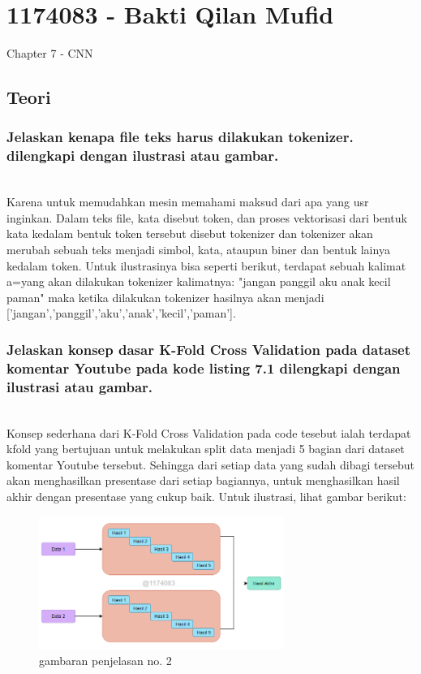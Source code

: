 \section{1174083 - Bakti Qilan Mufid}
Chapter 7 - CNN
\subsection{Teori}
\subsubsection{Jelaskan kenapa file teks harus dilakukan tokenizer. dilengkapi dengan ilustrasi atau gambar.}
\hfill\\
Karena untuk memudahkan mesin memahami maksud dari apa yang usr inginkan. Dalam teks file, kata disebut token, dan proses vektorisasi dari bentuk kata kedalam bentuk token tersebut disebut tokenizer dan tokenizer akan merubah sebuah teks menjadi simbol, kata, ataupun biner dan bentuk lainya kedalam token. Untuk ilustrasinya bisa seperti berikut, terdapat sebuah kalimat a=yang akan dilakukan tokenizer kalimatnya: "jangan panggil aku anak kecil paman" maka ketika dilakukan tokenizer hasilnya akan menjadi ['jangan','panggil','aku','anak','kecil','paman'].

\subsubsection{Jelaskan konsep dasar K-Fold Cross Validation pada dataset komentar Youtube pada kode listing 7.1 dilengkapi dengan ilustrasi atau gambar.}
\hfill\\


Konsep sederhana dari K-Fold Cross Validation pada code tesebut ialah terdapat kfold yang bertujuan untuk melakukan split data menjadi 5 bagian dari dataset komentar Youtube tersebut. Sehingga dari setiap data yang sudah dibagi tersebut akan menghasilkan presentase dari setiap bagiannya, untuk menghasilkan hasil akhir dengan presentase yang cukup baik. Untuk ilustrasi, lihat gambar berikut: 

\begin{figure}[H]
	\centering
	\includegraphics[width=8cm]{figures/1174083/figures7/1.png}
	\caption{gambaran penjelasan no. 2}
\end{figure}

